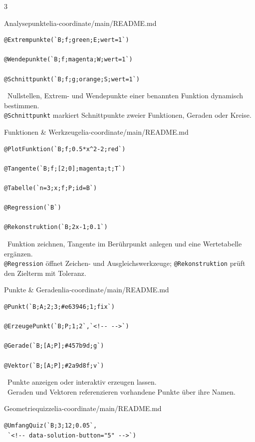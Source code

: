 \documentclass[a4paper,landscape,9pt]{extarticle}
\newcommand{\prevsm}[1]{{\footnotesize\color{muted} #1}}
\begin{document}
\begin{multicols}{3}
\begin{schulcard}{Analysepunkte}{lia-coordinate/main/README.md}
\begin{lstlisting}[language=lia]
@Extrempunkte(`B;f;green;E;wert=1`)

@Wendepunkte(`B;f;magenta;W;wert=1`)

@Schnittpunkt(`B;f;g;orange;S;wert=1`)
\end{lstlisting}
\tcblower
\prevsm{\faMapMarker~Nullstellen, Extrem- und Wendepunkte einer benannten Funktion dynamisch bestimmen.\\[2pt]
\texttt{@Schnittpunkt} markiert Schnittpunkte zweier Funktionen, Geraden oder Kreise.}
\end{schulcard}

\begin{schulcard}{Funktionen \& Werkzeuge}{lia-coordinate/main/README.md}
\begin{lstlisting}[language=lia]
@PlotFunktion(`B;f;0.5*x^2-2;red`)

@Tangente(`B;f;[2;0];magenta;t;T`)

@Tabelle(`n=3;x;f;P;id=B`)

@Regression(`B`)

@Rekonstruktion(`B;2x-1;0.1`)
\end{lstlisting}
\tcblower
\prevsm{\faChartLine~Funktion zeichnen, Tangente im Berührpunkt anlegen und eine Wertetabelle ergänzen.\\[2pt]
\texttt{@Regression} öffnet Zeichen- und Ausgleichswerkzeuge; \texttt{@Rekonstruktion} prüft den Zielterm mit Toleranz.}
\end{schulcard}

\begin{schulcard}{Punkte \& Geraden}{lia-coordinate/main/README.md}
\begin{lstlisting}[language=lia]
@Punkt(`B;A;2;3;#e63946;1;fix`)

@ErzeugePunkt(`B;P;1;2`,`<!-- -->`)

@Gerade(`B;[A;P];#457b9d;g`)

@Vektor(`B;[A;P];#2a9d8f;v`)
\end{lstlisting}
\tcblower
\prevsm{\faMapMarker~Punkte anzeigen oder interaktiv erzeugen lassen.\\[2pt]
\faProjectDiagram~Geraden und Vektoren referenzieren vorhandene Punkte über ihre Namen.}
\end{schulcard}

\begin{schulcard}{Geometriequizze}{lia-coordinate/main/README.md}
\begin{lstlisting}[language=lia]
@UmfangQuiz(`B;3;12;0.05`,
 `<!-- data-solution-button="5" -->`)


\end{lstlisting}
\end{schulcard}
\end{multicols}
\end{document}
